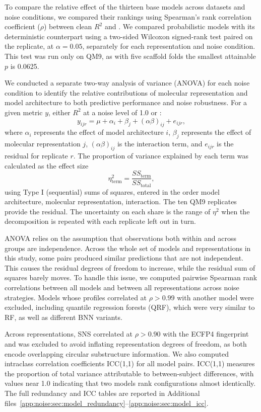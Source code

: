 To compare the relative effect of the thirteen base models across datasets and noise conditions, we compared their rankings using Spearman's rank correlation coefficient ($\rho$) between clean $R^2$ and \aucnorm. We compared probabilistic models  with its deterministic counterpart using a two-sided Wilcoxon signed-rank test paired on the replicate, at $\alpha = 0.05$, separately for each representation and noise condition. This test was run only on QM9, as with five scaffold folds the
smallest attainable $p$ is 0.0625.

We conducted a separate two-way analysis of variance (ANOVA) for each noise condition to identify the
relative contributions of molecular representation and model architecture to both predictive
performance and noise robustness. For a given metric $y$, either $R^2$ at a noise level of 1.0 or
\aucnorm:
\begin{equation}
y_{ijr} = \mu + \alpha_i + \beta_j + (\alpha\beta)_{ij} + e_{ijr},
\end{equation}
where $\alpha_i$ represents the effect of model architecture $i$, $\beta_j$ represents the effect of
molecular representation $j$, $(\alpha\beta)_{ij}$ is the interaction term, and $e_{ijr}$ is the
residual for replicate $r$. The proportion of variance explained by each term was calculated as the
effect size
\begin{equation}
\eta^2_{\text{term}} = \frac{SS_{\text{term}}}{SS_{\text{total}}},
\end{equation}
using Type I (sequential) sums of squares, entered in the order model architecture, molecular
representation, interaction. The ten QM9 replicates provide the residual. The uncertainty on each share is the range of $\eta^2$ when the decomposition is repeated with each replicate left out in turn. 

ANOVA relies on the assumption that observations both within and across groups are independence. Across the whole set of models and representations in this study, some pairs produced similar predictions that are not independent. This causes the residual degrees of freedom to increase, while the residual sum of squares barely moves. To handle this issue, we computed pairwise Spearman rank correlations between all models and between all representations across noise strategies. Models whose profiles correlated at $\rho > 0.99$ with another model were excluded, including quantile regression forests (QRF), which were very similar to RF, as well as different BNN variants. 

Across representations, SNS correlated at $\rho > 0.90$ with the ECFP4 fingerprint and was excluded to avoid inflating representation degrees of freedom, as both encode overlapping circular substructure information. We also computed intraclass correlation coefficients ICC(1,1) for all model pairs. ICC(1,1) measures the proportion of total variance attributable to between-subject differences, with values near 1.0 indicating that two models rank configurations almost identically. The full redundancy and ICC tables are reported in Additional files~\ref{app:noise:sec:model_redundancy}--\ref{app:noise:sec:model_icc}.

